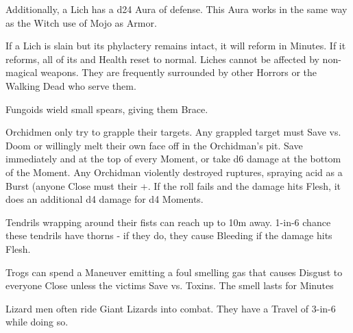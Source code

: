 {Additionally, a Lich has a d24 Aura of defense.  This Aura works in the same way as the Witch use of Mojo as Armor.

If a Lich is slain but its phylactery remains intact, it will reform in Minutes.  If it reforms, all of its \UD and Health reset to normal.
Liches cannot be affected by non-magical weapons.  They are frequently surrounded by other Horrors or the Walking Dead who serve them.

\newpage


\MONSTERBLOCK[
  Name=Fungoid,
  Link=monster-fungoid,
  MV=Base,
  WK=d24,
  DMG=d4 1 Close,
  HD=1,
  Power=Average,
  Soak=0,
  Morale=Orderly,
  Save=1,
  Extras={}
]
Fungoids wield small spears, giving them Brace.


\MONSTERBLOCK[
  Name=Orchidman,
  Link=monster-orchidman,
  MV=Base,
  WK=d20,
  DMG=d6 1 Close,
  HD=3,
  Power=Average,
  Soak=0,
  Morale=Orderly,
  Save=2,
  Extras={}
]
Orchidmen only try to grapple their targets. Any grappled target must Save vs. Doom or willingly melt their own face off in the Orchidman’s pit. Save immediately and at the top of every Moment, or take d6 damage at the bottom of the Moment.
Any Orchidman violently destroyed ruptures, spraying acid as a Burst (anyone Close must \RO their \MD+\DEX. If the roll fails and the damage hits Flesh, it does an additional d4 damage for d4 Moments.

\MONSTERBLOCK[
  Name=Swamp Thing,
  Link=monster-swamp-thing,
  MV=Slow,
  WK=d16,
  DMG=d6+d8 2 Nearby,
  HD=5,
  Power=Strong,
  Soak=2,
  Morale=Orderly,
  Save=3,
  Extras={}
]
Tendrils wrapping around their fists can reach up to 10m away.  1-in-6 chance these tendrils have thorns - if they do, they cause Bleeding if the damage hits Flesh.

\newpage



\MONSTERBLOCK[
  Name=Troglodyte,
  Link=monster-troglodyte,
  MV=Base,
  WK=d24,
  DMG=d6 1 Close,
  HD=1,
  Power=Average,
  Soak=0,
  Morale=Orderly,
  Save=1,
  Extras={}
]
Trogs can spend a Maneuver emitting a foul smelling gas that causes Disgust to everyone Close unless the victims Save vs. Toxins. The smell lasts for Minutes

\MONSTERBLOCK[
  Name=Lizard Man,
  Link=monster-lizard-man,
  MV=Base,
  WK=d20,
  DMG=2d4 1 Close,
  HD=2,
  Power=Average,
  Soak=0,
  Morale=Orderly,
  Save=2,
  Extras={}
]
Lizard men often ride Giant Lizards into combat.  They have a Travel of 3-in-6 while doing so.

}
